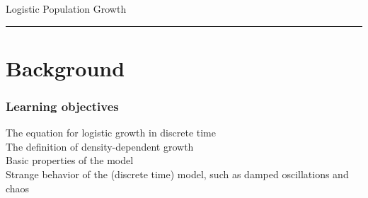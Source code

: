 \documentclass[color=usenames,dvipsnames]{beamer}\usepackage[]{graphicx}\usepackage[]{color}
\begin{document}
\setlength\fboxsep{0pt}


{
\begin{frame}[plain]
  \vspace{-2.35cm}
  \begin{center}
    {\huge Logistic Population Growth } \\
  \end{center}
  \begin{adjustwidth}{-1cm}{-1cm}
    \rule[-7mm]{\paperwidth}{0.5pt}
  \end{adjustwidth}
\end{frame}
}





\section{Background}



\begin{frame}[plain]
  \frametitle{Learning objectives}
  \Large
  The equation for logistic growth in discrete time \\
  \pause
  \vfill
  The definition of density-dependent growth \\
  \pause
  \vfill
  Basic properties of the model \\
  \pause
  \vfill
  Strange behavior of the (discrete time) model, such as damped oscillations and chaos \\
\end{frame}
\end{document}
